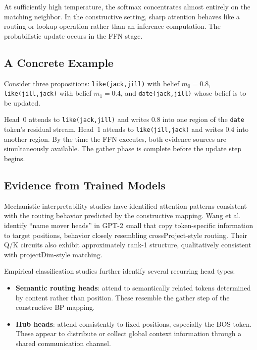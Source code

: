 At sufficiently high temperature, the softmax concentrates almost
entirely on the matching neighbor. In the constructive setting, sharp
attention behaves like a routing or lookup operation rather than an
inference computation. The probabilistic update occurs in the FFN stage.

\subsection*{A Concrete Example}

Consider three propositions:
\texttt{like(jack,jill)} with belief $m_0 = 0.8$,
\texttt{like(jill,jack)} with belief $m_1 = 0.4$, and
\texttt{date(jack,jill)} whose belief is to be updated.

Head~0 attends to \texttt{like(jack,jill)} and writes $0.8$ into one
region of the \texttt{date} token's residual stream. Head~1 attends to
\texttt{like(jill,jack)} and writes $0.4$ into another region. By the
time the FFN executes, both evidence sources are simultaneously
available. The gather phase is complete before the update step begins.

\subsection*{Evidence from Trained Models}

Mechanistic interpretability studies have identified attention patterns
consistent with the routing behavior predicted by the constructive
mapping. Wang et al.~\cite{wang2022ioi} identify ``name mover heads'' in
GPT-2 small that copy token-specific information to target positions,
behavior closely resembling crossProject-style routing. Their Q/K
circuits also exhibit approximately rank-1 structure, qualitatively
consistent with projectDim-style matching.

Empirical classification studies further identify several recurring head
types:

\begin{itemize}
\item \textbf{Semantic routing heads}: attend to semantically related
tokens determined by content rather than position. These resemble the
gather step of the constructive BP mapping.

\item \textbf{Hub heads}: attend consistently to fixed positions,
especially the BOS token. These appear to distribute or collect global
context information through a shared communication channel.
\end{itemize}

